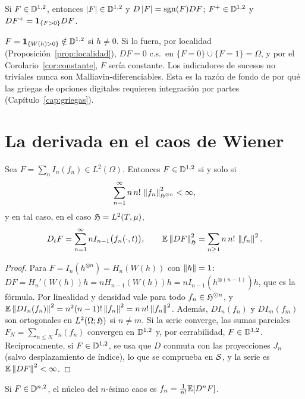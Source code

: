 \begin{ejemplo}
Si $F\in\mathbb{D}^{1,2}$, entonces $\left\lvert F\right\rvert\in\mathbb{D}^{1,2}$ y $D\left\lvert F\right\rvert=\operatorname{sgn}(F)DF$; $F^+\in\mathbb{D}^{1,2}$ y $DF^+=
\mathbf{1}_{\{F>0\}}DF$.
\end{ejemplo}

\begin{ejemplo}\label{ej:no-derivable}
$F=\mathbf{1}_{\{W(h)>0\}}\notin\mathbb{D}^{1,2}$ si $h\ne0$. Si lo fuera, por
localidad (Proposición~\ref{prop:localidad}), $DF=0$ c.s.\ en $\{F=0\}\cup\{F=1\}=\Omega$, y por el Corolario~\ref{cor:constante},
$F$ sería constante. Los indicadores de sucesos no triviales nunca son Malliavin-diferenciables.
Esta es la razón de fondo de por qué las griegas de opciones digitales requieren integración por
partes (Capítulo~\ref{cap:griegas}).
\end{ejemplo}

\section{La derivada en el caos de Wiener}

\begin{teorema}\label{teo:derivada-caos}
Sea $F=\sum_nI_n(f_n)\in L^2(\Omega)$. Entonces $F\in\mathbb{D}^{1,2}$ si y solo si
\[
  \sum_{n=1}^\infty n\,n!\,\left\lVert f_n\right\rVert^2_{\mathfrak{H}^{\otimes n}}<\infty,
\]
y en tal caso, en el caso $\mathfrak{H}=L^2(T,\mu)$,
\[
  D_tF=\sum_{n=1}^\infty nI_{n-1}\big(f_n(\cdot,t)\big),\qquad\mathbb{E}\left\lVert DF\right\rVert^2_{\mathfrak{H}}=\sum_{n\ge1}n\,n!\,\left\lVert f_n\right\rVert^2.
\]
\end{teorema}

\begin{proof}
Para $F=I_n(h^{\otimes n})=H_n(W(h))$ con $\left\lVert h\right\rVert=1$: $DF=H_n'(W(h))h=
nH_{n-1}(W(h))h=nI_{n-1}(h^{\otimes(n-1)})h$, que es la fórmula. Por linealidad y densidad vale para todo
$f_n\in\mathfrak{H}^{\odot n}$, y $\mathbb{E}\left\lVert DI_n(f_n)\right\rVert^2=n^2(n-1)!\left\lVert f_n\right\rVert^2=n\,n!\left\lVert f_n\right\rVert^2$. Además, $DI_n(f_n)$ y $DI_m(f_m)$ son
ortogonales en $L^2(\Omega;\mathfrak{H})$ si $n\ne m$. Si la serie converge, las sumas parciales $F_N=\sum_{n\le N}I_n(f_n)$
convergen en $\mathbb{D}^{1,2}$ y, por cerrabilidad, $F\in\mathbb{D}^{1,2}$. Recíprocamente, si $F\in\mathbb{D}^{1,2}$, se usa que $D$
conmuta con las proyecciones $J_n$ (salvo desplazamiento de índice), lo que se comprueba en $\mathcal{S}$, y
la serie es $\mathbb{E}\left\lVert DF\right\rVert^2<\infty$.
\end{proof}

\begin{corolario}\label{cor:stroock}
Si $F\in\mathbb{D}^{n,2}$, el núcleo del $n$-ésimo caos es $f_n=
\frac1{n!}\mathbb{E}[D^nF]$.
\end{corolario}


